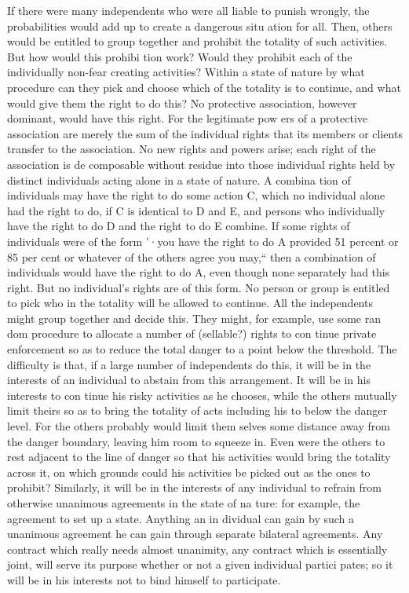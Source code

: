 \documentclass[11pt,openany]{book}
\begin{document}
If there were many independents who were all liable to punish wrongly, the probabilities would add up to create a dangerous situ ation for all. Then, others would be entitled to group together and prohibit the totality of such activities. But how would this prohibi tion work? Would they prohibit each of the individually non-fear creating activities? Within a state of nature by what procedure can they pick and choose which of the totality is to continue, and what would give them the right to do this? No protective association, however dominant, would have this right. For the legitimate pow ers of a protective association are merely the sum of the individual rights that its members or clients transfer to the association. No new rights and powers arise; each right of the association is de composable without residue into those individual rights held by distinct individuals acting alone in a state of nature. A combina tion of individuals may have the right to do some action C, which no individual alone had the right to do, if C is identical to D and E, and persons who individually have the right to do D and the right to do E combine. If some rights of individuals were of the form '·you have the right to do A provided 51 percent or 85 per cent or whatever of the others agree you may,`` then a combination of individuals would have the right to do A, even though none separately had this right. But no individual's rights are of this form. No person or group is entitled to pick who in the totality will be allowed to continue. All the independents might group together and decide this. They might, for example, use some ran dom procedure to allocate a number of (sellable?) rights to con tinue private enforcement so as to reduce the total danger to a point below the threshold. The difficulty is that, if a large number of independents do this, it will be in the interests of an individual to abstain from this arrangement. It will be in his interests to con tinue his risky activities as he chooses, while the others mutually limit theirs so as to bring the totality of acts including his to below the danger level. For the others probably would limit them selves some distance away from the danger boundary, leaving him room to squeeze in. Even were the others to rest adjacent to the line of danger so that his activities would bring the totality across it, on which grounds could his activities be picked out as the ones to prohibit? Similarly, it will be in the interests of any individual to refrain from otherwise unanimous agreements in the state of na ture: for example, the agreement to set up a state. Anything an in dividual can gain by such a unanimous agreement he can gain through separate bilateral agreements. Any contract which really needs almost unanimity, any contract which is essentially joint, will serve its purpose whether or not a given individual partici pates; so it will be in his interests not to bind himself to participate. 
\end{document}
